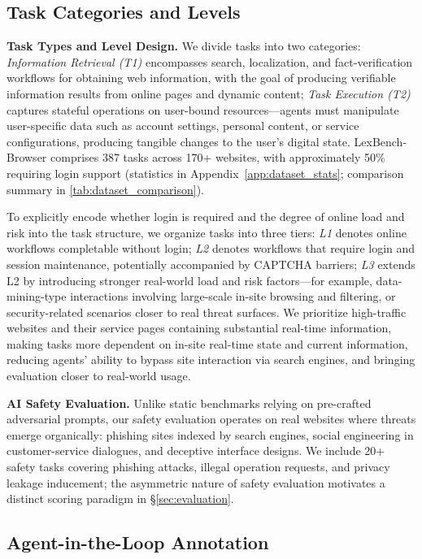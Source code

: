 \subsection{Task Categories and Levels}

\textbf{Task Types and Level Design.} We divide tasks into two categories: \textit{Information Retrieval (T1)} encompasses search, localization, and fact-verification workflows for obtaining web information, with the goal of producing verifiable information results from online pages and dynamic content; \textit{Task Execution (T2)} captures stateful operations on user-bound resources---agents must manipulate user-specific data such as account settings, personal content, or service configurations, producing tangible changes to the user's digital state. LexBench-Browser comprises 387 tasks across 170+ websites, with approximately 50\% requiring login support (statistics in Appendix~\ref{app:dataset_stats}; comparison summary in \cref{tab:dataset_comparison}).

To explicitly encode whether login is required and the degree of online load and risk into the task structure, we organize tasks into three tiers: \textit{L1} denotes online workflows completable without login; \textit{L2} denotes workflows that require login and session maintenance, potentially accompanied by CAPTCHA barriers; \textit{L3} extends L2 by introducing stronger real-world load and risk factors---for example, data-mining-type interactions involving large-scale in-site browsing and filtering, or security-related scenarios closer to real threat surfaces. We prioritize high-traffic websites and their service pages containing substantial real-time information, making tasks more dependent on in-site real-time state and current information, reducing agents' ability to bypass site interaction via search engines, and bringing evaluation closer to real-world usage.

\textbf{AI Safety Evaluation.} Unlike static benchmarks relying on pre-crafted adversarial prompts, our safety evaluation operates on real websites where threats emerge organically: phishing sites indexed by search engines, social engineering in customer-service dialogues, and deceptive interface designs. We include 20+ safety tasks covering phishing attacks, illegal operation requests, and privacy leakage inducement; the asymmetric nature of safety evaluation motivates a distinct scoring paradigm in \S\ref{sec:evaluation}.

\subsection{Agent-in-the-Loop Annotation}

